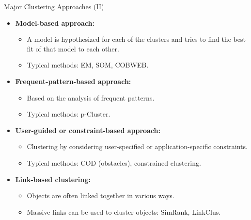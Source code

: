 \begin{frame}{Major Clustering Approaches (II)}
	\begin{itemize}
		\item \textbf{Model-based approach:}
		\begin{itemize}
			\item A model is hypothesized for each of the clusters and tries to 
			find the best fit of that model to each other.
			\item Typical methods: EM, SOM, COBWEB.
		\end{itemize}
		\item \textbf{Frequent-pattern-based approach:}
		\begin{itemize}
			\item Based on the analysis of frequent patterns.
			\item Typical methods: p-Cluster.
		\end{itemize}
		\item \textbf{User-guided or constraint-based approach:}
		\begin{itemize}
			\item Clustering by considering user-specified or 
			application-specific constraints.
			\item Typical methods: COD (obstacles), constrained clustering.
		\end{itemize}
		\item \textbf{Link-based clustering:}
		\begin{itemize}
			\item Objects are often linked together in various ways.
			\item Massive links can be used to cluster objects: SimRank, 
			LinkClus.
		\end{itemize}
	\end{itemize}
\end{frame}